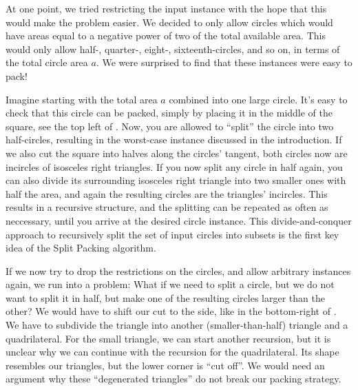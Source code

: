 \documentclass[a4paper,style=print,oneside,bibliography=totoc,nexus,lnum,extramargin]{tubsbook}
\begin{document}

At one point, we tried restricting the input instance with the hope that this would make the problem easier. We decided to only allow circles which would have areas equal to a negative power of two of the total available area. This would only allow half-, quarter-, eight-, sixteenth-circles, and so on, in terms of the total circle area $a$. We were surprised to find that these instances were easy to pack!

Imagine starting with the total area $a$ combined into one large circle. It's easy to check that this circle can be packed, simply by placing it in the middle of the square, see the top left of . Now, you are allowed to “split” the circle into two half-circles, resulting in the worst-case instance discussed in the introduction. If we also cut the square into halves along the circles' tangent, both circles now are incircles of isosceles right triangles.
If you now split any circle in half again, you can also divide its surrounding isosceles right triangle into two smaller ones with half the area, and again the resulting circles are the triangles' incircles.
This results in a recursive structure, and the splitting can be repeated as often as neccessary, until you arrive at the desired circle instance. This divide-and-conquer approach to recursively split the set of input circles into subsets is the first key idea of the Split Packing algorithm.


If we now try to drop the restrictions on the circles, and allow arbitrary instances again, we run into a problem: What if we need to split a circle, but we do not want to split it in half, but make one of the resulting circles larger than the other? We would have to shift our cut to the side, like in the bottom-right of . We have to subdivide the triangle into another (smaller-than-half) triangle and a quadrilateral. For the small triangle, we can start another recursion, but it is unclear why we can continue with the recursion for the quadrilateral. Its shape resembles our triangles, but the lower corner is “cut off”. We would need an argument why these “degenerated triangles” do not break our packing strategy.
\end{document}
